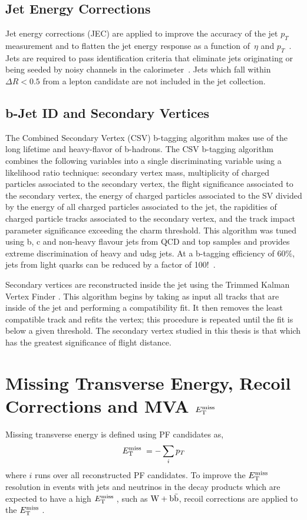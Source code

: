 \subsection{Jet Energy Corrections}
Jet energy corrections (JEC)
are applied to improve the accuracy of the jet $p_{T}$ measurement
and to flatten the jet energy response as a function
of~$\eta$ and $p_{T}$~\cite{jme-10-010}.
Jets are required to pass identification
criteria that eliminate jets originating or being seeded by
noisy channels in the calorimeter~\cite{Chatrchyan:2009hy}.
Jets which fall within $\Delta R < 0.5$ from a lepton candidate
are not included in the jet collection.

\subsection{b-Jet ID and Secondary Vertices}
The Combined Secondary Vertex (CSV) b-tagging algorithm makes use
of the long lifetime and heavy-flavor of b-hadrons.
The CSV b-tagging algorithm combines the following variables into a single discriminating
variable using a likelihood ratio technique: secondary vertex mass, multiplicity of charged
particles associated to the secondary vertex, the flight significance associated to the
secondary vertex, the energy of charged particles associated to the SV divided by the energy
of all charged particles associated to the jet, the rapidities of charged particle tracks associated
to the secondary vertex, and the track impact parameter significance exceeding the charm threshold.
This algorithm was tuned
using b, c and non-heavy flavour jets from QCD and top samples and provides extreme discrimination
of heavy and udsg jets. At a b-tagging efficiency of 60$\%$, jets from light quarks can be reduced
by a factor of 100!~\cite{refCSV}.

Secondary vertices are reconstructed inside the jet using the Trimmed Kalman Vertex Finder \cite{}.
This algorithm begins by taking as input all tracks that are inside of the jet and performing a compatibility fit. It then removes the least compatible track and refits the vertex; this procedure is repeated until
the fit is below a given threshold. The secondary vertex studied in this thesis is that which has
the greatest significance of flight distance.

\section{Missing Transverse Energy, Recoil Corrections and MVA $E_\mathrm{T}^{\mathrm{miss}}\;$}
Missing transverse energy is defined using PF candidates as,
\begin{equation}%
\MET = -\sum_{i} p_{T}
\end{equation}
where $i$ runs over all reconstructed PF candidates. 
To improve the $E_\mathrm{T}^{\mathrm{miss}}\;$ resolution in 
events with jets and neutrinos in the decay products 
which are expected to have a high $E_\mathrm{T}^{\mathrm{miss}}\;$, such as $\mathrm{W+\mathrm{b\bar{b}}}$,
recoil corrections are applied to the $E_\mathrm{T}^{\mathrm{miss}}\;$. 

